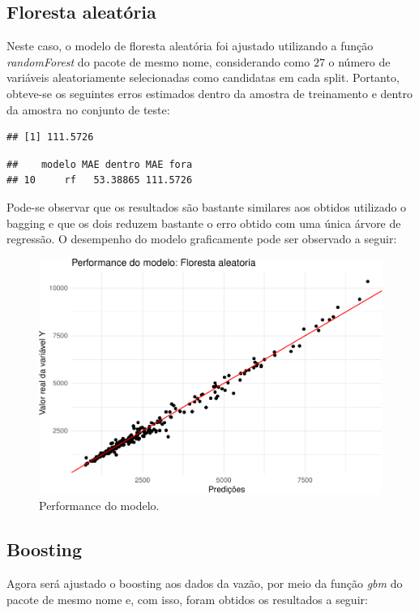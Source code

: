 \documentclass[11pt,]{article}
\begin{document}
\hypertarget{floresta-aleatuxf3ria}{%
\subsection{Floresta aleatória}\label{floresta-aleatuxf3ria}}

Neste caso, o modelo de floresta aleatória foi ajustado utilizando a
função \textit{randomForest} do pacote de mesmo nome, considerando como
\(27\) o número de variáveis aleatoriamente selecionadas como candidatas
em cada split. Portanto, obteve-se os seguintes erros estimados dentro
da amostra de treinamento e dentro da amostra no conjunto de teste:

\begin{verbatim}
## [1] 111.5726
\end{verbatim}

\begin{verbatim}
##    modelo MAE dentro MAE fora
## 10     rf   53.38865 111.5726
\end{verbatim}

\noindent Pode-se observar que os resultados são bastante similares aos
obtidos utilizado o bagging e que os dois reduzem bastante o erro obtido
com uma única árvore de regressão. O desempenho do modelo graficamente
pode ser observado a seguir:

\begin{figure}

{\centering \includegraphics[width=0.6\linewidth]{figs/unnamed-chunk-18} 

}

\caption{Performance do modelo.}\label{fig:unnamed-chunk-18}
\end{figure}

\hypertarget{boosting-1}{%
\subsection{Boosting}\label{boosting-1}}

Agora será ajustado o boosting aos dados da vazão, por meio da função
\textit{gbm} do pacote de mesmo nome e, com isso, foram obtidos os
resultados a seguir:
\end{document}
